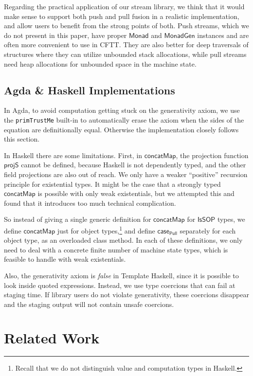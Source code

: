 \documentclass[acmsmall,screen,review,anonymous]{acmart}
\newcommand{\mit}[1]{{\mathsf{#1}}}
\newcommand{\msf}[1]{{\mathsf{#1}}}
\newcommand{\IsSOP}{\msf{IsSOP}}
\newcommand{\Monad}{\msf{Monad}}
\newcommand{\concatMap}{\msf{concatMap}}
\theoremstyle{remark}
\newcommand{\MonadGen}{\msf{MonadGen}}
\newcommand{\Pull}{\msf{Pull}}
\begin{document}
Regarding the practical application of our stream library, we think that it
would make sense to support both push and pull fusion in a realistic
implementation, and allow users to benefit from the strong points of both. Push
streams, which we do not present in this paper, have proper $\Monad$ and
$\MonadGen$ instances and are often more convenient to use in CFTT. They are
also better for deep traversals of structures where they can utilize unbounded
stack allocations, while pull streams need heap allocations for unbounded space
in the machine state.

\subsection{Agda \& Haskell Implementations}

In Agda, to avoid computation getting stuck on the generativity axiom, we use
the \texttt{primTrustMe} built-in \cite{agdadocs} to automatically erase the axiom
when the sides of the equation are definitionally equal. Otherwise the
implementation closely follows this section.

In Haskell there are some limitations. First, in $\concatMap$, the
projection function $\mit{projS}$ cannot be defined, because Haskell is not
dependently typed, and the other field projections are also out of reach. We
only have a weaker ``positive'' recursion principle for existential types. It
might be the case that a strongly typed $\concatMap$ is possible with only weak
existentials, but we attempted this and found that it introduces too much
technical complication.

So instead of giving a single generic definition for $\concatMap$ for $\IsSOP$
types, we define $\concatMap$ just for object types,\footnote{Recall that we do
not distinguish value and computation types in Haskell.} and define
$\mit{case_\Pull}$ separately for each object type, as an overloaded class
method. In each of these definitions, we only need to deal with a concrete
finite number of machine state types, which is feasible to handle with weak
existentials.

Also, the generativity axiom is \emph{false} in Template Haskell, since it is
possible to look inside quoted expressions. Instead, we use type coercions that
can fail at staging time. If library users do not violate generativity, these
coercions disappear and the staging output will not contain unsafe coercions.

\section{Related Work}\label{sec:related-work}
\end{document}
